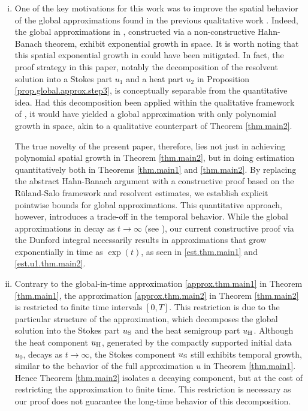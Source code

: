 \documentclass[11pt,a4paper]{article}
\numberwithin{equation}{section}
\begin{document}
\begin{remark}\label{rem.thm.main12}
\begin{enumerate}[(i)]
\item
One of the key motivations for this work was to improve the spatial behavior of the global approximations found in the previous qualitative work \cite{HigSue2025}. Indeed, the global approximations in \cite{HigSue2025}, constructed via a non-constructive Hahn-Banach theorem, exhibit exponential growth in space. It is worth noting that this spatial exponential growth in \cite{HigSue2025} could have been mitigated. In fact, the proof strategy in this paper, notably the decomposition of the resolvent solution into a Stokes part $u_1$ and a heat part $u_2$ in Proposition \ref{prop.global.approx.step3}, is conceptually separable from the quantitative idea. Had this decomposition been applied within the qualitative framework of \cite{HigSue2025}, it would have yielded a global approximation with only polynomial growth in space, akin to a qualitative counterpart of Theorem \ref{thm.main2}. 


The true novelty of the present paper, therefore, lies not just in achieving polynomial spatial growth in Theorem \ref{thm.main2}, but in doing estimation quantitatively both in Theorems \ref{thm.main1} and \ref{thm.main2}. By replacing the abstract Hahn-Banach argument with a constructive proof based on the R\"{u}land-Salo framework and resolvent estimates, we establish explicit pointwise bounds for global approximations. This quantitative approach, however, introduces a trade-off in the temporal behavior. While the global approximations in \cite{HigSue2025} decay as $t\to\infty$ (see \cite[Section 3.6]{HigSue2025}), our current constructive proof via the Dunford integral necessarily results in approximations that grow exponentially in time as $\exp(t)$, as seen in \eqref{est.thm.main1} and \eqref{est.u1.thm.main2}.


\item
Contrary to the global-in-time approximation \eqref{approx.thm.main1} in Theorem \ref{thm.main1}, the approximation \eqref{approx.thm.main2} in Theorem \ref{thm.main2} is restricted to finite time intervals $[0,T]$. This restriction is due to the particular structure of the approximation, which decomposes the global solution into the Stokes part $u_{{\rm S}}$ and the heat semigroup part $u_{{\rm H}}$. Although the heat component $u_{{\rm H}}$, generated by the compactly supported initial data $u_0$, decays as $t\to\infty$, the Stokes component $u_{{\rm S}}$ still exhibits temporal growth, similar to the behavior of the full approximation $u$ in Theorem \ref{thm.main1}. Hence Theorem \ref{thm.main2} isolates a decaying component, but at the cost of restricting the approximation to finite time. This restriction is necessary as our proof does not guarantee the long-time behavior of this decomposition.



\end{enumerate}
\end{remark}
\end{document}

